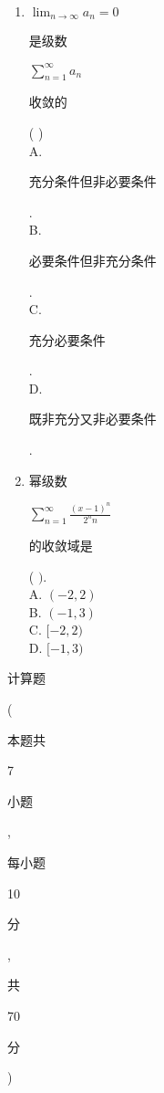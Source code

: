 \documentclass[10pt]{article}
\begin{document}
\begin{enumerate}
  \item $\lim _{n \rightarrow \infty} a_{n}=0$ \begin{CJK}{UTF8}{mj}是级数\end{CJK} $\sum_{n=1}^{\infty} a_{n}$ \begin{CJK}{UTF8}{mj}收敛的\end{CJK} ( )\\
A. \begin{CJK}{UTF8}{mj}充分条件但非必要条件\end{CJK}.\\
B. \begin{CJK}{UTF8}{mj}必要条件但非充分条件\end{CJK}.\\
C. \begin{CJK}{UTF8}{mj}充分必要条件\end{CJK}.\\
D. \begin{CJK}{UTF8}{mj}既非充分又非必要条件\end{CJK}.

  \item \begin{CJK}{UTF8}{mj}幂级数\end{CJK} $\sum_{n=1}^{\infty} \frac{(x-1)^{n}}{2^{n} n}$ \begin{CJK}{UTF8}{mj}的收敛域是\end{CJK} ( $)$.\\
A. $(-2,2)$\\
B. $(-1,3)$\\
C. $[-2,2)$\\
D. $[-1,3)$

\end{enumerate}
\begin{CJK}{UTF8}{mj}计算题\end{CJK} (\begin{CJK}{UTF8}{mj}本题共\end{CJK} 7 \begin{CJK}{UTF8}{mj}小题\end{CJK}, \begin{CJK}{UTF8}{mj}每小题\end{CJK} 10 \begin{CJK}{UTF8}{mj}分\end{CJK}, \begin{CJK}{UTF8}{mj}共\end{CJK} 70 \begin{CJK}{UTF8}{mj}分\end{CJK})
\end{document}
